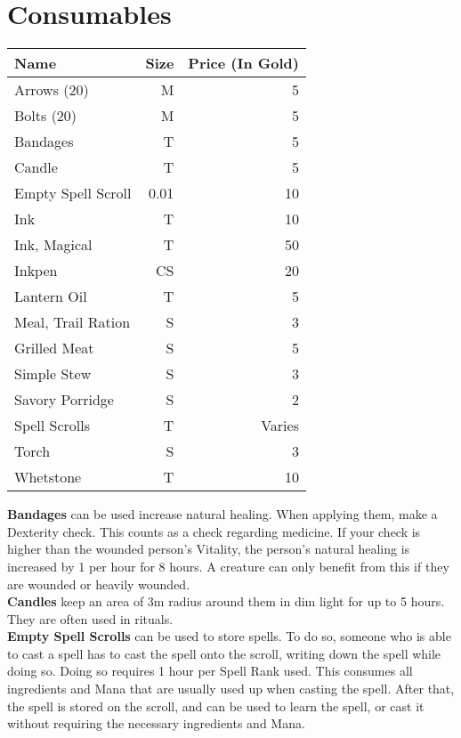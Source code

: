 \section{Consumables}\label{sec:consumables}
\begin{longtable}{l | r | r}
	Name & Size & Price (In Gold)\\ \hline
	Arrows (20) & M & 5\\
	Bolts (20) & M & 5\\
	Bandages & T & 5\\
	Candle & T & 5\\
	Empty Spell Scroll & 0.01 & 10\\
	Ink & T & 10\\
	Ink, Magical & T & 50\\
	Inkpen & CS & 20\\
	Lantern Oil & T & 5\\
	Meal, Trail Ration & S & 3\\
	Grilled Meat & S & 5\\
	Simple Stew & S & 3\\
	Savory Porridge & S & 2\\
	Spell Scrolls & T & Varies\\
	Torch & S & 3\\
	Whetstone & T & 10\\
\end{longtable}


\textbf{Bandages} can be used increase natural healing.
When applying them, make a Dexterity check.
This counts as a check regarding medicine.
If your check is higher than the wounded person's Vitality, the person's natural healing is increased by 1 per hour for 8 hours.
A creature can only benefit from this if they are wounded or heavily wounded.\\

\textbf{Candles} keep an area of 3m radius around them in dim light for up to 5 hours.
They are often used in rituals.\\

\textbf{Empty Spell Scrolls} can be used to store spells.
To do so, someone who is able to cast a spell has to cast the spell onto the scroll, writing down the spell while doing so.
Doing so requires 1 hour per Spell Rank used.
This consumes all ingredients and Mana that are usually used up when casting the spell.
After that, the spell is stored on the scroll, and can be used to learn the spell, or cast it without requiring the necessary ingredients and Mana.

